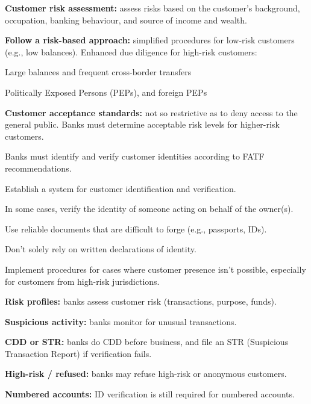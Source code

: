 \begin{checks}
\item \textbf{Customer risk assessment:} assess risks based on the customer's
background, occupation, banking behaviour, and source of income and wealth.
\item \textbf{Follow a risk-based approach:} simplified procedures for low-risk
customers (e.g., low balances). Enhanced due diligence for high-risk customers:
  \begin{lettered}
  \item Large balances and frequent cross-border transfers
  \item Politically Exposed Persons (PEPs), and foreign PEPs
  \end{lettered}
\item \textbf{Customer acceptance standards:} not so restrictive as to deny
access to the general public. Banks must determine acceptable risk levels for
higher-risk customers.
\end{checks}


\begin{checks}
\item Banks must identify and verify customer identities according to FATF
recommendations.
\item Establish a system for customer identification and verification.
\item In some cases, verify the identity of someone acting on behalf of the
owner(s).
\item Use reliable documents that are difficult to forge (e.g., passports, IDs).
\item Don't solely rely on written declarations of identity.
\item Implement procedures for cases where customer presence isn't possible,
especially for customers from high-risk jurisdictions.
\end{checks}


\begin{checks}
\item \textbf{Risk profiles:} banks assess customer risk (transactions, purpose,
funds).
\item \textbf{Suspicious activity:} banks monitor for unusual transactions.
\item \textbf{CDD or STR:} banks do CDD before business, and file an STR
(Suspicious Transaction Report) if verification fails.
\item \textbf{High-risk / refused:} banks may refuse high-risk or anonymous
customers.
\item \textbf{Numbered accounts:} ID verification is still required for numbered
accounts.
\end{checks}

